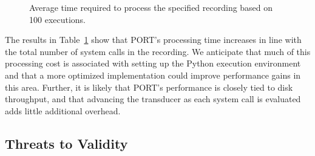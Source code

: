\begin{figure}[t]
\centering
\small
{}
\caption{Average time required to process the specified recording based on 100 executions.}
\label{tbl:RealWorldPerformance}
\end{figure}


The results in Table~\ref{tbl:RealWorldPerformance} show that
PORT's
processing time increases in line with the total number of system calls
in the recording.  We anticipate that much of this processing cost is
associated with setting up the Python execution environment and that a more
optimized implementation could improve performance gains in this area.
Further,
it is likely that PORT's performance is closely tied to
disk throughput,
and that advancing the transducer
as each system call is evaluated
adds little additional overhead.


\subsection{Threats to Validity}

